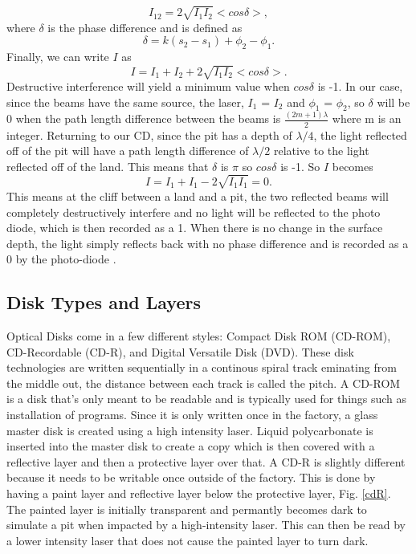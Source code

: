 \documentclass[ notitlepage, numerical, 11pt]{revtex4-1} %
\begin{document}
\begin{equation}
I_{12} = 2\sqrt{I_1 I_2}<cos\delta>,
\label{iInf2}
\end{equation}
where $\delta$ is the phase difference and is defined as 
\begin{equation}
\delta = k(s_2 - s_1) +\phi_2 -\phi_1.
\label{delta}
\end{equation}
Finally, we can write $I$ as 
\begin{equation}
I = I_1 + I_2 +  2\sqrt{I_1 I_2}<cos\delta>.
\label{finalI}
\end{equation}
Destructive interference will yield a minimum value when $cos\delta$ is -1. In our case, since the beams have the same source, the laser, $I_1$ = $I_2$ and $\phi_1$ =  $\phi_2$, so $\delta$ will be 0 when the path length difference between the beams is $\frac{(2m+1)\lambda}{2}$ where m is an integer. Returning to our CD, since the pit has a depth of $\lambda/4$, the light reflected off of the pit will have a path length difference of $\lambda/2$ relative to the light reflected off of the land. This means that $\delta$ is $\pi$ so $cos\delta$ is -1. So $I$ becomes
\begin{equation}
I = I_1 + I_1 - 2\sqrt{I_1 I_1} = 0.
\label{finalI2}
\end{equation}
This means at the cliff between a land and a pit, the two reflected beams will completely destructively interfere and no light will be reflected to the photo diode, which is then recorded as a 1. When there is no change in the surface depth, the light simply reflects back with no phase difference and is recorded as a 0 by the photo-diode \cite{memory}.

\subsection{Disk Types and Layers}
Optical Disks come in a few different styles: Compact Disk ROM (CD-ROM), CD-Recordable (CD-R), and Digital Versatile Disk (DVD). These disk technologies are written sequentially in a continous spiral track eminating from the middle out, the distance between each track is called the pitch. A CD-ROM is a disk that's only meant to be readable and is typically used for things such as installation of programs. Since it is only written once in the factory, a glass master disk is created using a high intensity laser. Liquid polycarbonate is inserted into the master disk to create a copy which is then covered with a reflective layer and then a protective layer over that. 
A CD-R is slightly different because it needs to be writable once outside of the factory. This is done by having a paint layer and reflective layer below the protective layer, Fig. \ref{cdR}. The painted layer is initially transparent and permantly becomes dark to simulate a pit when impacted by a high-intensity laser. This can then be read by a lower intensity laser that does not cause the painted layer to turn dark.
\end{document}

